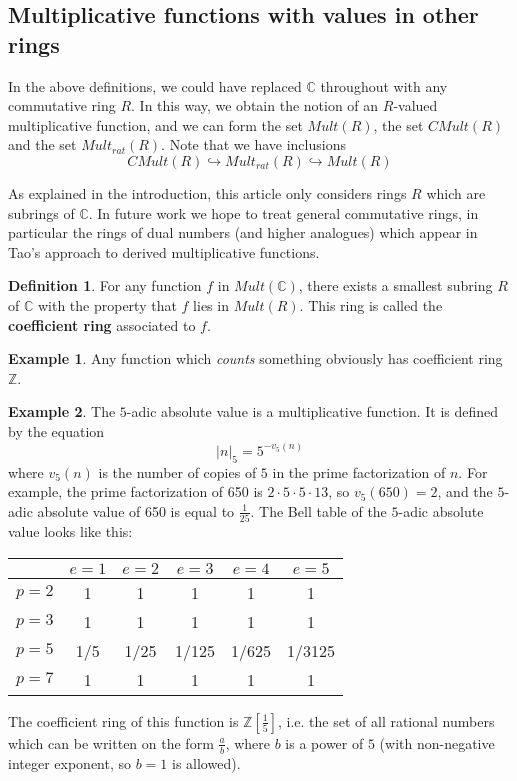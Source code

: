 \documentclass[a4paper]{article}
\theoremstyle{definition}
\newtheorem{definition}{Definition}[section]
\newtheorem{example}{Example}[section]
\theoremstyle{remark}
\newcommand{\Z}{\mathbb{Z}}
\newcommand{\C}{\mathbb{C}}
\newcommand{\defhl}[1]{\textbf{#1}}
\begin{document}
\subsection{Multiplicative functions with values in other rings}

In the above definitions, we could have replaced $\C$ throughout with any commutative ring $R$. In this way, we obtain the notion of an $R$-valued multiplicative function, and we can form the set $Mult(R)$, the set $CMult(R)$ and the set $Mult_{rat}(R)$. Note that we have inclusions
$$ CMult(R) \hookrightarrow Mult_{rat}(R) \hookrightarrow Mult(R)   $$

As explained in the introduction, this article only considers rings $R$ which are subrings of $\C$. In future work we hope to treat general commutative rings, in particular the rings of dual numbers (and higher analogues) which appear in Tao's approach to derived multiplicative functions.
\begin{definition}
For any function $f$ in $Mult(\C)$, there exists a smallest subring $R$ of $\C$ with the property that $f$ lies in $Mult(R)$. This ring is called the \defhl{coefficient ring} associated to $f$. 
\end{definition}

\begin{example}
Any function which \emph{counts} something obviously has coefficient ring $\mathbb{Z}$.
\end{example}


\begin{example}
The $5$-adic absolute value is a multiplicative function. It is defined by the equation
$$   \vert n \vert_5 = 5^{-v_5(n)}  $$
where $v_5(n)$ is the number of copies of $5$ in the prime factorization of $n$. For example, the prime factorization of 650 is $2 \cdot 5 \cdot 5 \cdot  13$, so $v_5(650) = 2$, and the $5$-adic absolute value of 650 is equal to $\frac{1}{25}$.
The Bell table of the $5$-adic absolute value looks like this:
\vskip10pt
\begin{center}
\begin{tabular}{| l | | c | c | c | c | c |}
\hline
& $e = 1$ & $e = 2$ & $e = 3$ & $e = 4$ & $e = 5$\\
\hline
\hline
$p = 2$ & 1 & 1 & 1 & 1 & 1 \\
\hline
$p = 3$ & 1 & 1 & 1 & 1 & 1 \\
\hline
$p = 5$ & 1/5 & 1/25 & 1/125 & 1/625 & 1/3125 \\
\hline
$p = 7$ & 1 & 1 & 1 & 1 & 1 \\
\hline
\end{tabular}
\end{center}
The coefficient ring of this function is $\Z[\frac{1}{5}]$, i.e. the set of all rational numbers which can be written on the form $\frac{a}{b}$, where $b$ is a power of $5$ (with non-negative integer exponent, so $b =1$ is allowed).  
\end{example}
\end{document}
